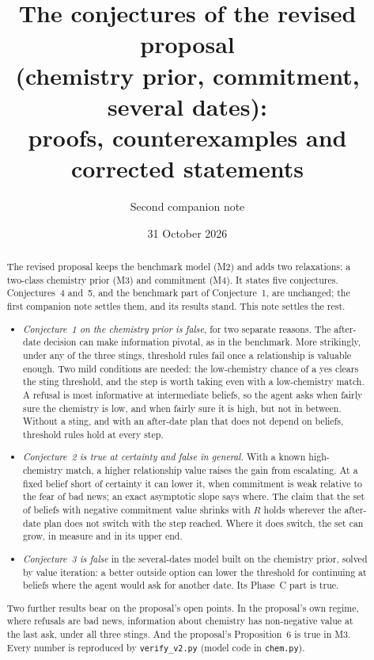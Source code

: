 \documentclass[11pt,a4paper]{article}
\title{The conjectures of the revised proposal\\(chemistry prior, commitment, several dates):\\ proofs, counterexamples and corrected statements}
\author{Second companion note}
\date{31 October 2026}
\theoremstyle{definition}
\theoremstyle{remark}
\begin{document}
\maketitle

\begin{abstract}
The revised proposal keeps the benchmark model (M2) and adds two relaxations: a two-class chemistry prior (M3) and commitment (M4). It states five conjectures. Conjectures~4 and~5, and the benchmark part of Conjecture~1, are unchanged; the first companion note settles them, and its results stand. This note settles the rest.
\begin{itemize}[nosep]
\item \emph{Conjecture~1 on the chemistry prior is false}, for two separate reasons. The after-date decision can make information pivotal, as in the benchmark. More strikingly, under any of the three stings, threshold rules fail once a relationship is valuable enough. Two mild conditions are needed: the low-chemistry chance of a yes clears the sting threshold, and the step is worth taking even with a low-chemistry match. A refusal is most informative at intermediate beliefs, so the agent asks when fairly sure the chemistry is low, and when fairly sure it is high, but not in between. Without a sting, and with an after-date plan that does not depend on beliefs, threshold rules hold at every step.
\item \emph{Conjecture~2 is true at certainty and false in general.} With a known high-chemistry match, a higher relationship value raises the gain from escalating. At a fixed belief short of certainty it can lower it, when commitment is weak relative to the fear of bad news; an exact asymptotic slope says where. The claim that the set of beliefs with negative commitment value shrinks with $R$ holds wherever the after-date plan does not switch with the step reached. Where it does switch, the set can grow, in measure and in its upper end.
\item \emph{Conjecture~3 is false} in the several-dates model built on the chemistry prior, solved by value iteration: a better outside option can lower the threshold for continuing at beliefs where the agent would ask for another date. Its Phase~C part is true.
\end{itemize}
Two further results bear on the proposal's open points. In the proposal's own regime, where refusals are bad news, information about chemistry has non-negative value at the last ask, under all three stings. And the proposal's Proposition~6 is true in M3. Every number is reproduced by \texttt{verify\_v2.py} (model code in \texttt{chem.py}).
\end{abstract}
\end{document}
